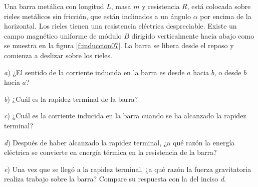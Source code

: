 \begin{Exercise}\label{p:induccion07}
    Una barra metálica con longitud $L$, masa $m$ y resistencia $R$, está colocada sobre rieles metálicos sin fricción, que están inclinados a un ángulo $\alpha$ por encima de la horizontal. Los rieles tienen una resistencia eléctrica despreciable. Existe un campo magnético uniforme de módulo $B$ dirigido verticalmente hacia abajo como se muestra en la figura \ref{f:induccion07}. La barra se libera desde el reposo y comienza a deslizar sobre los rieles.\par
    \textit{a}) ¿El sentido de la corriente inducida en la barra es desde $a$ hacia $b$, o desde $b$ hacia $a$?\par
    \textit{b}) ¿Cuál es la rapidez terminal de la barra?\par
    \textit{c}) ¿Cuál es la corriente inducida en la barra cuando se ha alcanzado la rapidez terminal?\par
    \textit{d}) Después de haber alcanzado la rapidez terminal, ¿a qué razón la energía eléctrica se convierte en energía térmica en la resistencia de la barra?\par
    \textit{e}) Una vez que se llegó a la rapidez terminal, ¿a qué razón la fuerza gravitatoria realiza trabajo sobre la barra? Compare su respuesta con la del inciso \textit{d}.
\end{Exercise}
%
\begin{center}
\end{center}

